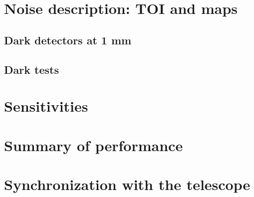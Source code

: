 \documentclass[a4paper, 11pt]{article} %
\begin{document}
\section{Noise description: TOI and maps}
\label{se:noise}

\subsection{Dark detectors at 1 mm}

\clearpage
\subsection{Dark tests}
\label{se:dark}



\section{Sensitivities}
\label{se:nefd}


\clearpage
\section{Summary of performance}
\label{se:summary}


\clearpage
\appendix

  \section{Synchronization with the telescope}
  \label{ap:synchro}
  
  
\end{document}

